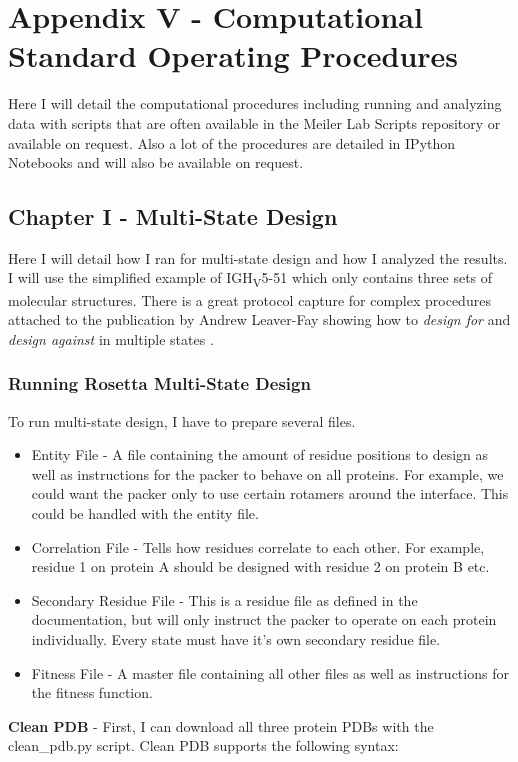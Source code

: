 \section{Appendix V - Computational Standard Operating Procedures}
\label{sec:appenixV}
Here I will detail the computational procedures including running \rosetta and analyzing data with scripts that are often available in the Meiler Lab Scripts repository or available on request. Also a lot of the procedures are detailed in IPython Notebooks and will also be available on request.
\subsection{Chapter I - Multi-State Design}
Here I will detail how I ran \rosettadesign for multi-state design and how I analyzed the results. I will use the simplified example of IGH\textsubscript{V}5-51 which only contains three sets of molecular structures. There is a great protocol capture for complex procedures attached to the publication by Andrew Leaver-Fay showing how to \textit{design for} and \textit{design against} in multiple states \citep{LeaverFay:2011ji}.
\subsubsection{Running Rosetta Multi-State Design}
To run multi-state design, I have to prepare several files.

\begin{itemize}
\item Entity File - A file containing the amount of residue positions to design as well as instructions for the packer to behave on all proteins. For example, we could want the packer only to use certain rotamers around the interface. This could be handled with the entity file.
\item Correlation File - Tells how residues correlate to each other. For example, residue 1 on protein A should be designed with residue 2 on protein B etc.
\item Secondary Residue File - This is a residue file as defined in the documentation, but will only instruct the packer to operate on each protein individually. Every state must have it's own secondary residue file.
\item Fitness File - A master file containing all other files as well as instructions for the fitness function.
\end{itemize}

\textbf{Clean PDB} - First, I can download all three protein PDBs with the clean\_pdb.py script. Clean PDB supports the following syntax:


